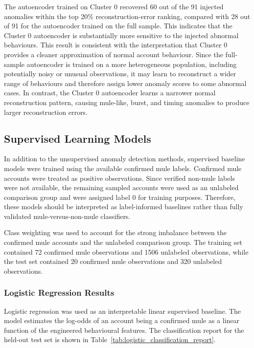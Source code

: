 The autoencoder trained on Cluster 0 recovered 60 out of the 91 injected anomalies within the top 20\% reconstruction-error ranking, compared with 28 out of 91 for the autoencoder trained on the full sample. This indicates that the Cluster 0 autoencoder is substantially more sensitive to the injected abnormal behaviours. This result is consistent with the interpretation that Cluster 0 provides a cleaner approximation of normal account behaviour. Since the full-sample autoencoder is trained on a more heterogeneous population, including potentially noisy or unusual observations, it may learn to reconstruct a wider range of behaviours and therefore assign lower anomaly scores to some abnormal cases. In contrast, the Cluster 0 autoencoder learns a narrower normal reconstruction pattern, causing mule-like, burst, and timing anomalies to produce larger reconstruction errors.



\subsection{Supervised Learning Models}

In addition to the unsupervised anomaly detection methods, supervised baseline models were trained using the available confirmed mule labels. Confirmed mule accounts were treated as positive observations. Since verified non-mule labels were not available, the remaining sampled accounts were used as an unlabeled comparison group and were assigned label 0 for training purposes. Therefore, these models should be interpreted as label-informed baselines rather than fully validated mule-versus-non-mule classifiers.

Class weighting was used to account for the strong imbalance between the confirmed mule accounts and the unlabeled comparison group. The training set contained 72 confirmed mule observations and 1506 unlabeled observations, while the test set contained 20 confirmed mule observations and 320 unlabeled observations.

\subsubsection{Logistic Regression Results}

Logistic regression was used as an interpretable linear supervised baseline. The model estimates the log-odds of an account being a confirmed mule as a linear function of the engineered behavioural features. The classification report for the held-out test set is shown in Table~\ref{tab:logistic_classification_report}.

